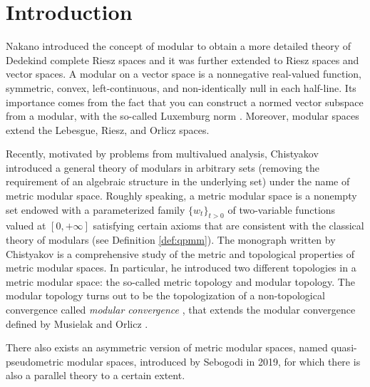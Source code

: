 \documentclass[11pt,a4paper]{amsart}
\theoremstyle{definition}
\begin{document}
	
	
	\maketitle
	
	
	\section{Introduction}
	
	
	Nakano introduced the concept of modular \cite{Nakano50} to obtain a more detailed theory of Dedekind complete Riesz spaces and it was further extended to Riesz spaces and vector spaces.  A modular on a vector space is a nonnegative real-valued function, symmetric, convex, left-continuous, and non-identically null in each half-line. Its importance comes from the fact that you can construct a normed vector subspace from a modular, with the so-called Luxemburg norm \cite{KhamsiKoz15}. Moreover, modular spaces extend the Lebesgue, Riesz, and Orlicz spaces. 
	
	Recently, motivated by problems from multivalued analysis, Chistyakov \cite{Chis10a,Chis10b} introduced a general theory of modulars in arbitrary sets (removing the requirement of an algebraic structure in the underlying set) under the name of metric modular space. Roughly speaking, a metric modular space is a nonempty set endowed with a parameterized family $\{w_t\}_{t>0}$ of two-variable functions valued at $[0,+\infty]$ satisfying certain axioms that are consistent with the classical theory of modulars (see Definition \ref{def:qpmm}). The monograph \cite{Chis15} written by Chistyakov is a comprehensive study of the metric and topological properties of metric modular spaces. In particular, he introduced two different topologies in a metric modular space: the so-called metric topology and modular topology. The modular topology turns out to be the topologization  \cite[Theorem 4.3.5]{Chis15} of a non-topological convergence called \emph{modular convergence} \cite[Definition 4.2.1]{Chis15}, that extends the modular convergence defined by Musielak and Orlicz \cite{MusiOrlicz59}. 
	
	There also exists an asymmetric version of metric modular spaces, named quasi-pseudometric modular spaces, introduced by Sebogodi \cite{SebogodiPhD} in 2019, for which there is also a parallel theory to a certain extent.
	
\end{document}
